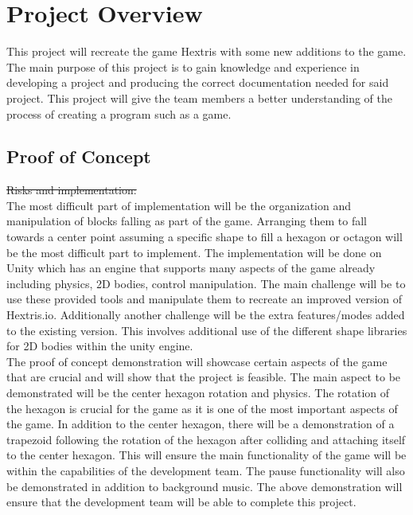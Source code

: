 \documentclass[12pt]{article}
\begin{document}
\section{Project Overview}
This project will recreate the game Hextris with some new additions to the game. The main purpose of this project is to gain knowledge and experience in developing a project and producing the correct documentation needed for said project. This project will give the team members a better understanding of the process of creating a program such as a game.

\subsection{Proof of Concept}
\sout{Risks and implementation:}\\

The most difficult part of implementation will be the organization and manipulation of blocks falling as part of the game. Arranging them to fall towards a center point assuming a specific shape to fill a hexagon or octagon will be the most difficult part to implement. The implementation will be done on Unity which has an engine that supports many aspects of the game already including physics, 2D bodies, control manipulation. The main challenge will be to use these provided tools and manipulate them to recreate an improved version of Hextris.io. Additionally another challenge will be the extra features/modes added to the existing version. This involves additional use of the different shape libraries for 2D bodies within the unity engine.\\ 

{\color{blue} The proof of concept demonstration will showcase certain aspects of the game that are crucial and will show that the project is feasible. The main aspect to be demonstrated will be the center hexagon rotation and physics. The rotation of the hexagon is crucial for the game as it is one of the most important aspects of the game. In addition to the center hexagon, there will be a demonstration of a trapezoid following the rotation of the hexagon after colliding and attaching itself to the center hexagon. This will ensure the main functionality of the game will be within the capabilities of the development team. The pause functionality will also be demonstrated in addition to background music. The above demonstration will ensure that the development team will be able to complete this project.} \\
\end{document}
